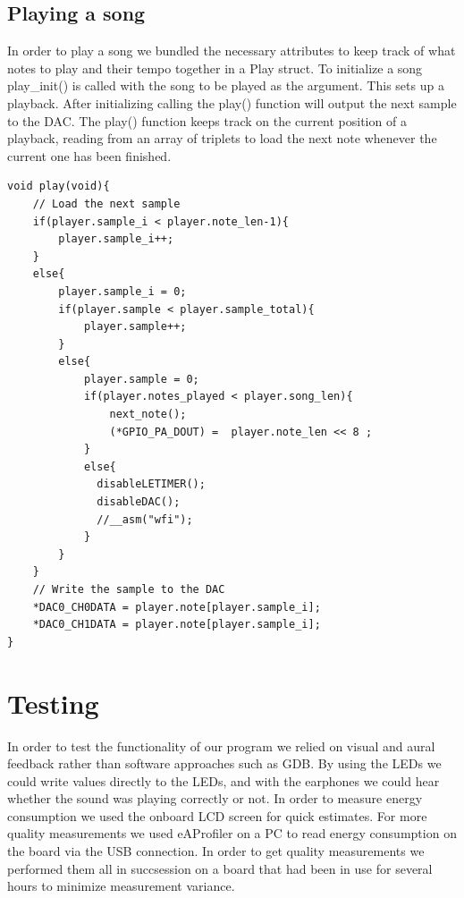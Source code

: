 \subsection{Playing a song}
In order to play a song we bundled the necessary attributes to keep track of what notes to play and their tempo together in a Play struct. To initialize a song play\_init() is called with the song to be played as the argument. This sets up a playback. After initializing calling the play() function will output the next sample to the DAC.
The play() function keeps track on the current position of a playback, reading from an array of triplets to load the next note whenever the current one has been finished. \\

\begin{minipage}{\textwidth}
\begin{lstlisting}
void play(void){
	// Load the next sample
	if(player.sample_i < player.note_len-1){			
		player.sample_i++;								
	}
	else{								
		player.sample_i = 0;
		if(player.sample < player.sample_total){
   			player.sample++;				
		}
		else{							
			player.sample = 0;
			if(player.notes_played < player.song_len){
				next_note();
				(*GPIO_PA_DOUT) =  player.note_len << 8 ;		
			}			 
			else{
			  disableLETIMER();
			  disableDAC();
			  //__asm("wfi");
			}
		}
	}
	// Write the sample to the DAC
	*DAC0_CH0DATA = player.note[player.sample_i];
	*DAC0_CH1DATA = player.note[player.sample_i];
}
\end{lstlisting}
\end{minipage}


\section{Testing}
In order to test the functionality of our program we relied on visual and aural feedback rather than software approaches such as GDB. By using the LEDs we could write values directly to the LEDs, and with the earphones we could hear whether the sound was playing correctly or not. In order to measure energy consumption we used the onboard LCD screen for quick estimates. For more quality measurements we used eAProfiler on a PC to read energy consumption on the board via the USB connection. In order to get quality measurements we performed them all in succsession on a board that had been in use for several hours to minimize measurement variance. 

